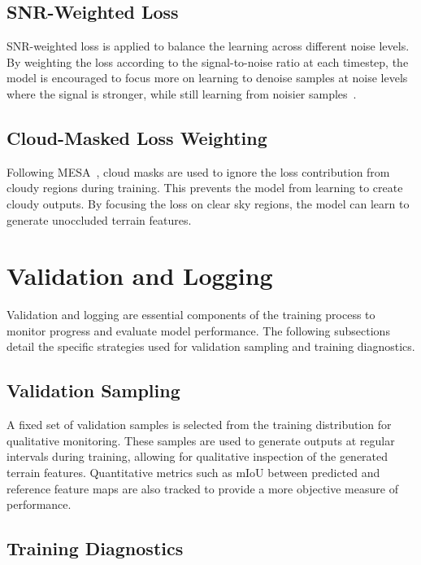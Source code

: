 \subsection{SNR-Weighted Loss}
\label{subsec:snr_weighted_loss_method}

SNR-weighted loss is applied to balance the learning across different noise levels. By weighting the loss according to the signal-to-noise ratio at each timestep, the model is encouraged to focus more on learning to denoise samples at noise levels where the signal is stronger, while still learning from noisier samples~\cite{hang2024efficientdiffusiontrainingminsnr}.

\subsection{Cloud-Masked Loss Weighting}
\label{subsec:cloud_masked_loss_weighting}

Following MESA~\cite{borne-pons2025mesa}, cloud masks are used to ignore the loss contribution from cloudy regions during training. This prevents the model from learning to create cloudy outputs. By focusing the loss on clear sky regions, the model can learn to generate unoccluded terrain features.

\section{Validation and Logging}
\label{sec:validation_and_logging}

Validation and logging are essential components of the training process to monitor progress and evaluate model performance. The following subsections detail the specific strategies used for validation sampling and training diagnostics.

\subsection{Validation Sampling}
\label{subsec:validation_sampling}

A fixed set of validation samples is selected from the training distribution for qualitative monitoring. These samples are used to generate outputs at regular intervals during training, allowing for qualitative inspection of the generated terrain features. Quantitative metrics such as mIoU between predicted and reference feature maps are also tracked to provide a more objective measure of performance.

\subsection{Training Diagnostics}
\label{subsec:training_diagnostics}

